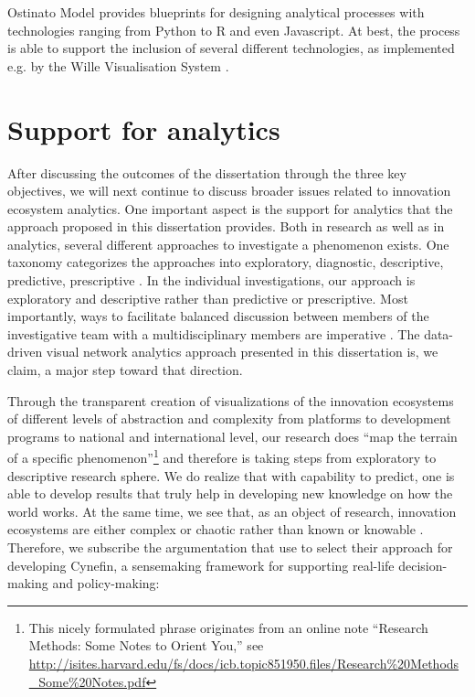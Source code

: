 Ostinato Model provides blueprints for designing analytical processes with technologies ranging from Python to R and even Javascript. At best, the process is able to support the inclusion of several different technologies, as implemented e.g. by the Wille Visualisation System \citep{Nykanen2008}.

\section{Support for analytics}

After discussing the outcomes of the dissertation through the three key objectives, we will next continue to discuss broader issues related to innovation ecosystem analytics. One important aspect is the support for analytics that the approach proposed in this dissertation provides. Both in research as well as in analytics, several different approaches to investigate a phenomenon exists. One taxonomy categorizes the approaches into exploratory, diagnostic, descriptive, predictive, prescriptive \citep{Davenport2013Analytics3.0}. 
In the individual investigations, our approach is exploratory and descriptive rather than predictive or prescriptive. Most importantly, ways to facilitate balanced discussion between members of the investigative team with a multidisciplinary members are imperative \citep[cf.][]{Pentland2015,Nunamaker2011TowardSystems}. The data-driven visual network analytics approach presented in this dissertation is, we claim, a major step toward that direction.

Through the transparent creation of visualizations of the innovation ecosystems of different levels of abstraction and complexity from platforms to development programs to national and international level, our research does ``map the terrain of a specific phenomenon''\footnote{This nicely formulated phrase originates from an online note ``Research Methods: Some Notes to Orient You,'' see \url{http://isites.harvard.edu/fs/docs/icb.topic851950.files/Research\%20Methods_Some\%20Notes.pdf}} and therefore is taking steps from exploratory to descriptive research sphere. We do realize that with capability to predict, one is able to develop results that truly help in developing new knowledge on how the world works. At the same time, we see that, as an object of research, innovation ecosystems are either complex or chaotic rather than known or knowable \citep[cf.][]{Kurtz2003}. Therefore, we subscribe the argumentation that \cite{Kurtz2003} use to select their approach for developing Cynefin, a sensemaking framework for supporting real-life decision-making and policy-making: 
 
